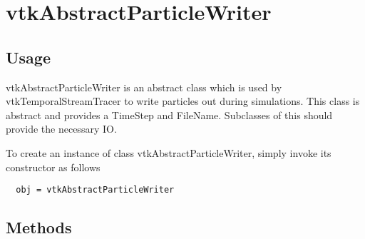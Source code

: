 \section{vtkAbstractParticleWriter}

\subsection{Usage}

 vtkAbstractParticleWriter is an abstract class which is used by
 vtkTemporalStreamTracer to write particles out during simulations.
 This class is abstract and provides a TimeStep and FileName.
 Subclasses of this should provide the necessary IO.

To create an instance of class vtkAbstractParticleWriter, simply
invoke its constructor as follows
\begin{verbatim}
  obj = vtkAbstractParticleWriter
\end{verbatim}
\subsection{Methods}

